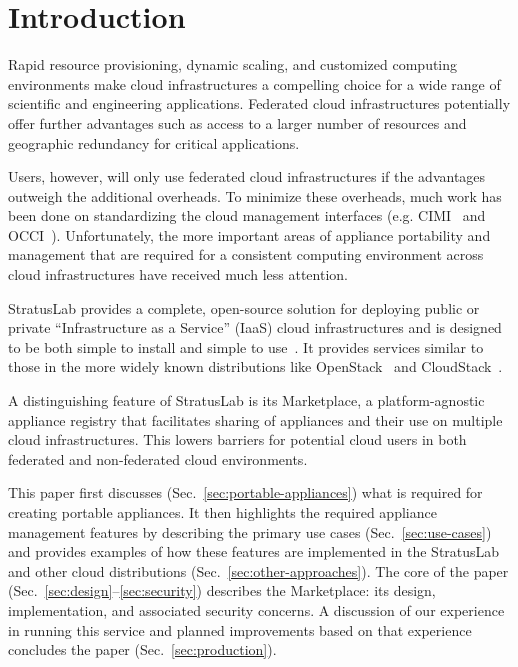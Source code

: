 \section{Introduction}
\label{sec:Introduction}

Rapid resource provisioning, dynamic scaling, and customized computing
environments make cloud infrastructures a compelling choice for a wide
range of scientific and engineering applications.  Federated cloud
infrastructures potentially offer further advantages such as access to
a larger number of resources and geographic redundancy for critical
applications.

Users, however, will only use federated cloud infrastructures if the
advantages outweigh the additional overheads.  To minimize these
overheads, much work has been done on standardizing the cloud
management interfaces (e.g. CIMI~\cite{cimi} and OCCI~\cite{occi}).
Unfortunately, the more important areas of appliance portability and
management that are required for a consistent computing environment
across cloud infrastructures have received much less attention.

StratusLab provides a complete, open-source solution for deploying
public or private ``Infrastructure as a Service'' (IaaS) cloud
infrastructures and is designed to be both simple to install and
simple to use~\cite{slbook}. It provides services similar to those in
the more widely known distributions like OpenStack~\cite{openstack}
and CloudStack~\cite{cloudstack}.

A distinguishing feature of StratusLab is its Marketplace, a
platform-agnostic appliance registry that facilitates sharing of
appliances and their use on multiple cloud infrastructures.  This
lowers barriers for potential cloud users in both federated and
non-federated cloud environments.

This paper first discusses (Sec.~\ref{sec:portable-appliances}) what
is required for creating portable appliances. It then highlights the
required appliance management features by describing the primary use
cases (Sec.~\ref{sec:use-cases}) and provides examples of how these
features are implemented in the StratusLab and other cloud
distributions (Sec.~\ref{sec:other-approaches}).  The core of the
paper (Sec.~\ref{sec:design}--\ref{sec:security}) describes the
Marketplace: its design, implementation, and associated security
concerns.  A discussion of our experience in running this service and
planned improvements based on that experience concludes the paper
(Sec.~\ref{sec:production}).

